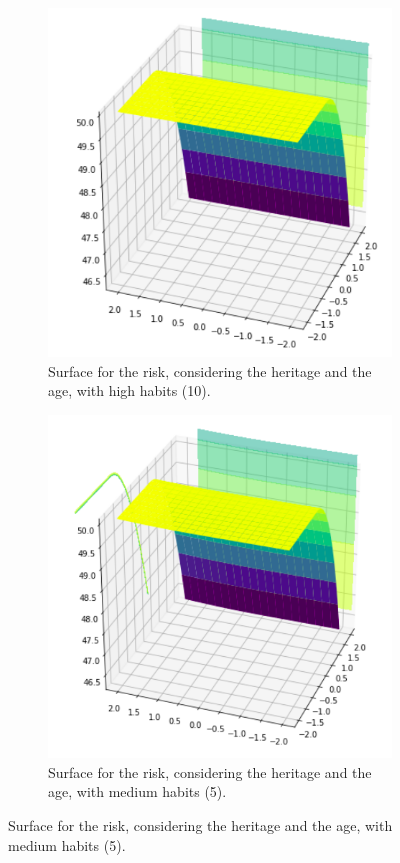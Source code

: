 \begin{figure}[ht]
\begin{subfigure}{.3\textwidth}
  \centering
  \includegraphics[width=.8\linewidth]{figures/surfaces/age-heritage10.png}  
  \caption{Surface for the risk, considering the heritage and the age, with high habits (10).}
  \label{fig:sur1}
\end{subfigure}
\begin{subfigure}{.3\textwidth}
  \centering
  \includegraphics[width=.8\linewidth]{figures/surfaces/age-heritage5.png}  
  \caption{Surface for the risk, considering the heritage and the age, with medium habits (5).}

\end{subfigure}
\end{figure}
